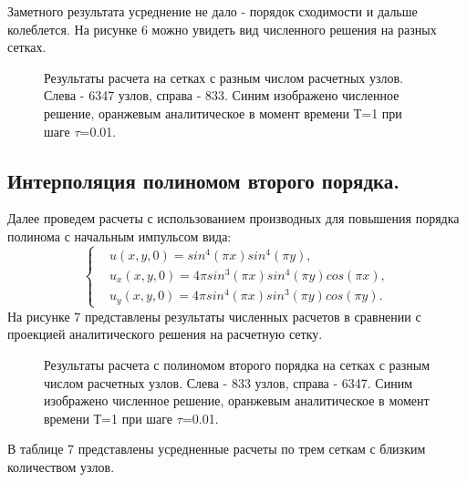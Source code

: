 \documentclass[14pt]{article}
\begin{document}
\newpage
Заметного результата усреднение не дало - порядок сходимости и дальше колеблется. На рисунке 6 можно увидеть вид численного решения на разных сетках.
\begin{figure}[!h!]
\caption{Результаты расчета на сетках с разным числом расчетных узлов. Слева - 6347 узлов, справа - 833. Синим изображено численное решение, оранжевым аналитическое в момент времени Т=1 при шаге $\tau$=0.01.}
\end{figure}
\subsection{Интерполяция полиномом второго порядка.}
Далее проведем расчеты с использованием производных для повышения порядка полинома с начальным импульсом вида:
\begin{equation}
\left\lbrace
\begin{aligned}
&u(x,y,0) = sin^4(\pi x)sin^4(\pi y),\\
&u_x(x,y,0) =  4\pi sin^3(\pi x) sin^4(\pi y)  cos(\pi x),\\
&u_y(x,y,0) = 4\pi sin^4(\pi x)sin^3(\pi y)cos(\pi y).
\end{aligned}
\right .
\end{equation}
На рисунке 7 представлены результаты численных расчетов в сравнении с проекцией аналитического решения на расчетную сетку.
\begin{figure}[!h!]
\caption{Результаты расчета с полиномом второго порядка на сетках с разным числом расчетных узлов. Слева - 833 узлов, справа - 6347. Синим изображено численное решение, оранжевым аналитическое в момент времени Т=1 при шаге $\tau$=0.01.}
\end{figure}
 В таблице 7 представлены усредненные расчеты по трем сеткам с близким количеством узлов.
\end{document}
